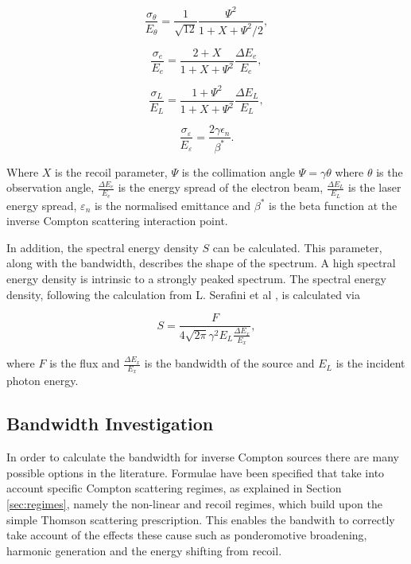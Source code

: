 \documentclass[11pt]{article}
\begin{document}
\begin{equation}
\frac{\sigma_{\theta}}{E_{\theta}} = \frac{1}{\sqrt{12}}\frac{\Psi^{2}}{1+X+\Psi^{2}/2},
\label{eq:collterm}
\end{equation}

\begin{equation}
\frac{\sigma_{e}}{E_{e}} = \frac{2+X}{1+X+\Psi^{2}}\frac{\Delta E_{e}}{E_{e}},
\label{eq:beamterm}
\end{equation}

\begin{equation}
\frac{\sigma_{L}}{E_{L}} = \frac{1+\Psi^{2}}{1+X+\Psi^{2}}\frac{\Delta E_{L}}{E_{L}},
\label{eq:laserterm}
\end{equation}

\begin{equation}
\frac{\sigma_{\varepsilon}}{E_{\varepsilon}} = \frac{2\gamma \epsilon_{n}}{\beta^{*}}.
\label{eq:emitterm}
\end{equation}

\noindent Where $X$ is the recoil parameter, $\Psi$ is the collimation angle $\Psi = \gamma\theta$ where $\theta$ is the observation angle, $\frac{\Delta E_{e}}{E_{e}}$ is the energy spread of the electron beam, $\frac{\Delta E_{L}}{E_{L}}$ is the laser energy spread, $\varepsilon_{n}$ is the normalised emittance and $\beta^{*}$ is the beta function at the inverse Compton scattering interaction point. 

In addition, the spectral energy density $S$ can be calculated. This parameter, along with the bandwidth, describes the shape of the spectrum. A high spectral energy density is intrinsic to a strongly peaked spectrum. The spectral energy density, following the calculation from L. Serafini et al \cite{SerafiniAnalytical}, is calculated via 

\begin{equation}
S = \frac{F}{4\sqrt{2\pi}\gamma^{2}E_{L}\frac{\Delta E_{x}}{E_{x}}},
\label{eq:specden}
\end{equation}

\noindent where $F$ is the flux and $\frac{\Delta E_{x}}{E_{x}}$ is the bandwidth of the source and $E_{L}$ is the incident photon energy.   
   

\subsection{Bandwidth Investigation}
\label{sec:bandinv}

In order to calculate the bandwidth for inverse Compton sources there are many possible options in the literature. Formulae have been specified that take into account specific Compton scattering regimes, as explained in Section \ref{sec:regimes}, namely the non-linear and recoil regimes, which build upon the simple Thomson scattering prescription. This enables the bandwith to correctly take account of the effects these cause such as ponderomotive broadening, harmonic generation and the energy shifting from recoil.
\end{document}

